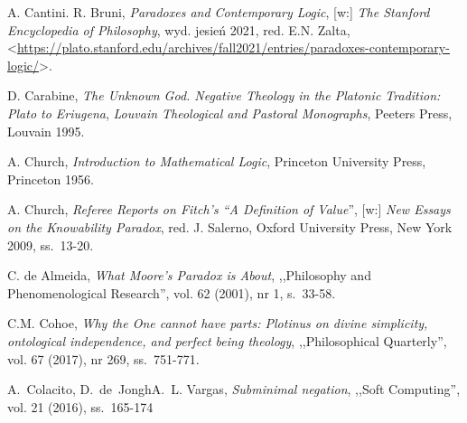 \begin{thebibliography}{100}
A. Cantini. R. Bruni, \textit{Paradoxes and Contemporary Logic}, [w:] \textit{The Stanford Encyclopedia of Philosophy},
wyd. jesień 2021, red. E.N. Zalta, {\textless}\url{https://plato.stanford.edu/archives/fall2021/entries/paradoxes-contemporary-logic/}{\textgreater}.

D. Carabine, \textit{The Unknown God. Negative Theology in the Platonic Tradition: Plato to Eriugena}, \textit{Louvain Theological and Pastoral Monographs}, Peeters Press, Louvain 1995.



A. Church, \textit{Introduction to Mathematical Logic}, Princeton University Press, Princeton 1956.

A. Church, \textit{Referee Reports on Fitch's ``A Definition of Value}'', [w:] \textit{New Essays on the Knowability Paradox},
red. J. Salerno, Oxford University Press, New York 2009, ss.~13-20.

C. de Almeida, \textit{What Moore's Paradox is About}, ,,Philosophy and Phenomenological Research'', vol. 62 (2001), nr 1, s.~33-58.

C.M. Cohoe, \textit{Why the One cannot have parts: Plotinus on divine simplicity, ontological independence, and perfect being theology}, ,,Philosophical Quarterly'', vol. 67 (2017), nr 269, ss.~751-771.


A.~Colacito, D.~de~Jongh\bbland{}A.~L. Vargas, \textit{Subminimal negation}, ,,Soft Computing'', vol. 21 (2016), ss.~165-174



\end{thebibliography}
